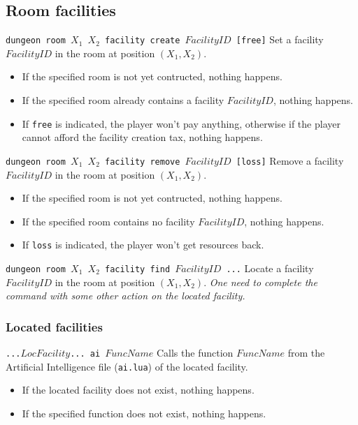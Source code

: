 \documentclass[10pt,a4paper]{scrartcl}
\newenvironment{apiCode}[1]
{ \begin{lrbox}{\mybox} \begin{minipage}{0.9\textwidth} {\color{Mahogany} \small\texttt{#1}} \vspace{8pt} \newline }
{ \end{minipage} \end{lrbox}\fbox{\usebox{\mybox}} \newline\vspace{4pt}\newline }
\begin{document}
\subsection{Room facilities}
\begin{apiCode}{dungeon room $X_1$ $X_2$ facility create $FacilityID$ [free]}
Set a facility $FacilityID$ in the room at position $(X_1, X_2)$.
\begin{itemize}
\itemsep 0em
\item If the specified room is not yet contructed, nothing happens.
\item If the specified room already contains a facility $FacilityID$, nothing happens.
\item If \verb#free# is indicated, the player won't pay anything,\newline
	  otherwise if the player cannot afford the facility creation tax, nothing happens.
\end{itemize}
\end{apiCode}
\begin{apiCode}{dungeon room $X_1$ $X_2$ facility remove $FacilityID$ [loss]}
Remove a facility $FacilityID$ in the room at position $(X_1, X_2)$.
\begin{itemize}
\itemsep 0em
\item If the specified room is not yet contructed, nothing happens.
\item If the specified room contains no facility $FacilityID$, nothing happens.
\item If \verb#loss# is indicated, the player won't get resources back.
\end{itemize}
\end{apiCode}
\begin{apiCode}{dungeon room $X_1$ $X_2$ facility find $FacilityID$ ...}
Locate a facility $FacilityID$ in the room at position $(X_1, X_2)$.\newline
\textit{One need to complete the command with some other action on the located facility.}
\end{apiCode}

\subsubsection*{Located facilities}
\begin{apiCode}{...$LocFacility$... ai $FuncName$}
Calls the function $FuncName$ from the Artificial Intelligence file (\texttt{ai.lua}) of the located facility.
\begin{itemize}
\itemsep 0em
\item If the located facility does not exist, nothing happens.
\item If the specified function does not exist, nothing happens.
\end{itemize}
\end{apiCode}
\end{document}

